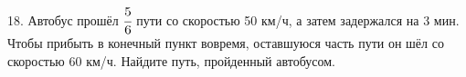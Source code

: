 18. Автобус прошёл $\cfrac{5}{6}$ пути со скоростью 50 км/ч, а затем задержался на 3 мин. Чтобы прибыть в конечный пункт вовремя, оставшуюся часть пути он шёл со скоростью 60 км/ч. Найдите путь, пройденный автобусом.\\
